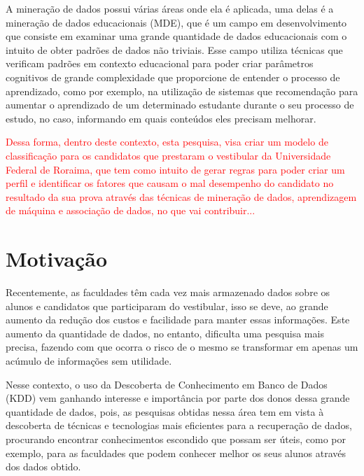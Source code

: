 \par
A mineração de dados possui várias áreas onde ela é aplicada, uma delas é a mineração de dados educacionais (MDE), que é um campo em desenvolvimento que consiste em examinar uma grande quantidade de dados educacionais com o intuito de obter padrões de dados não triviais. Esse campo utiliza técnicas que verificam padrões em contexto educacional para poder criar parâmetros cognitivos de grande complexidade que proporcione de entender o processo de aprendizado, como por exemplo, na utilização de sistemas que recomendação para aumentar o aprendizado de um determinado estudante durante o seu processo de estudo, no caso, informando em quais conteúdos eles precisam melhorar.

\par
\textcolor{red}{Dessa forma, dentro deste contexto, esta pesquisa, visa criar um modelo de classificação para os candidatos que prestaram o vestibular da Universidade Federal de Roraima,  que tem como intuito de gerar regras para poder criar um perfil e identificar os fatores que causam o mal desempenho do candidato no resultado da sua prova através das técnicas de mineração de dados, aprendizagem de máquina e associação de dados, no que vai contribuir...}







\section{Motivação}

Recentemente, as faculdades têm cada vez mais armazenado dados sobre os alunos e candidatos que participaram do vestibular, isso se deve, ao  grande aumento da redução dos custos e facilidade para manter essas informações. Este aumento da quantidade de dados, no entanto, dificulta uma pesquisa mais precisa, fazendo com que ocorra o risco de o mesmo se transformar em apenas um acúmulo de informações sem utilidade. 

\par
Nesse contexto, o uso da Descoberta de Conhecimento em Banco de Dados (KDD) vem ganhando interesse e importância por parte dos donos dessa grande quantidade de dados, pois, as pesquisas obtidas nessa área tem em vista à descoberta de técnicas e tecnologias mais eficientes para a recuperação de dados, procurando encontrar conhecimentos escondido que possam ser úteis, como por exemplo, para as faculdades que podem conhecer melhor os seus alunos através dos dados obtido.

